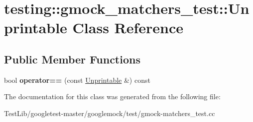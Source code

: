 \hypertarget{classtesting_1_1gmock__matchers__test_1_1Unprintable}{}\section{testing\+:\+:gmock\+\_\+matchers\+\_\+test\+:\+:Unprintable Class Reference}
\label{classtesting_1_1gmock__matchers__test_1_1Unprintable}
\subsection*{Public Member Functions}
\begin{DoxyCompactItemize}
\item 
\mbox{\label{classtesting_1_1gmock__matchers__test_1_1Unprintable_ae09dc235a5341b07f0299bd24ee37e2d}} 
bool {\bfseries operator==} (const \hyperlink{classtesting_1_1gmock__matchers__test_1_1Unprintable}{Unprintable} \&) const
\end{DoxyCompactItemize}


The documentation for this class was generated from the following file\+:\begin{DoxyCompactItemize}
\item 
Test\+Lib/googletest-\/master/googlemock/test/gmock-\/matchers\+\_\+test.\+cc\end{DoxyCompactItemize}
